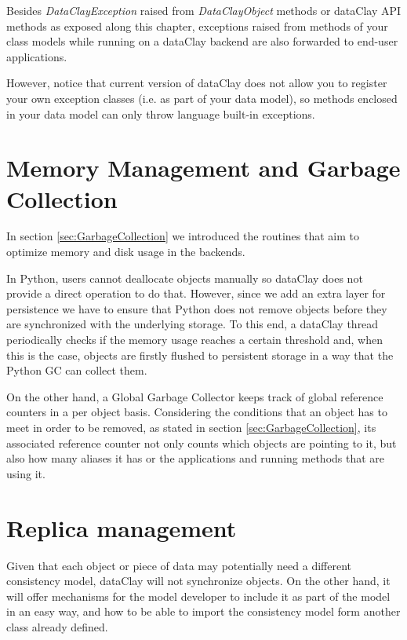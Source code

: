 Besides \textit{DataClayException} raised from \textit{DataClayObject} methods or dataClay API methods as exposed along this chapter, exceptions raised from methods of your class models while running on a dataClay backend are also forwarded to end-user applications.

However, notice that current version of dataClay does not allow you to register your own exception classes (i.e. as part of your data model), so methods enclosed in your data model can only throw language built-in exceptions.

\section {Memory Management and Garbage Collection}

In section \ref{sec:GarbageCollection} we introduced the routines that aim to optimize memory and disk usage in the backends.

In Python, users cannot deallocate objects manually so dataClay does not provide a direct operation to do that. However, since we add an extra layer for persistence we have to ensure that Python does not remove objects before they are synchronized with the underlying storage. To this end, a dataClay thread periodically checks if the memory usage reaches a certain threshold and, when this is the case, objects are firstly flushed to persistent storage in a way that the Python GC can collect them.

On the other hand, a Global Garbage Collector keeps track of global reference counters in a per object basis. Considering the conditions that an object has to meet in order to be removed, as stated in section \ref{sec:GarbageCollection}, its associated reference counter not only counts which objects are pointing to it, but also how many aliases it has or the applications and running methods that are using it.

\section{Replica management}
\label{sec:PythonReplication}

Given that each object or piece of data may potentially need a different consistency model, dataClay will not synchronize objects. On the other hand, it will offer mechanisms for the model developer to include it as part of the model in an easy way, and how to be able to import the consistency model form another class already defined.

